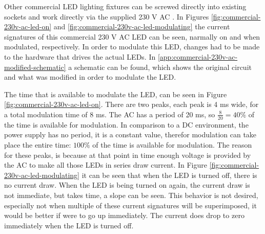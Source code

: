Other commercial LED lighting fixtures can be screwed directly into existing sockets and work directly via the supplied 230 V AC \cite{commercial-230v-ac-led-aliexpress}.
In Figures \ref{fig:commercial-230v-ac-led-on} and \ref{fig:commercial-230v-ac-led-modulating} the current signatures of this commercial 230 V AC LED can be seen, narmally on and when modulated, respectively.
In order to modulate this LED, changes had to be made to the hardware that drives the actual LEDs.
In \autoref{app:commercial-230v-ac-modified-schematic} a schematic can be found, which shows the original circuit and what was modified in order to modulate the LED.









The time that is available to modulate the LED, can be seen in Figure \ref{fig:commercial-230v-ac-led-on}.
There are two peaks, each peak is 4 ms wide, for a total modulation time of 8 ms.
The AC has a period of 20 ms, so $\frac{8}{20} = 40 \%$ of the time is available for modulation.
In comparison to a DC environment, the power supply has no period, it is a constant value, therefor modulation can take place the entire time: $100 \%$ of the time is available for modulation.
The reason for these peaks, is because at that point in time enough voltage is provided by the AC to make all those LEDs in series draw current.
In Figure \ref{fig:commercial-230v-ac-led-modulating} it can be seen that when the LED is turned off, there is no current draw.
When the LED is being turned on again, the current draw is not immediate, but takes time, a slope can be seen.
This behavior is not desired, especially not when multiple of these current signatures will be superimposed, it would be better if were to go up immediately.
The current does drop to zero immediately when the LED is turned off.

